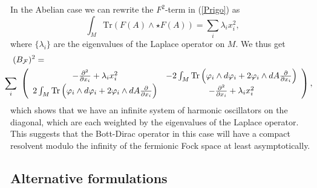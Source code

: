 \documentclass[letterpaper,11pt]{article}
\newcommand{\nn}{\nonumber}
\def\cf{{\cal F}}
\newcommand{\pa}{\partial}
\begin{document}
In the Abelian case we can rewrite the $F^2$-term in (\ref{Prigo}) as
$$
\int_M \mbox{Tr}\left( F(A)\wedge \star F(A)\right) = \sum_i \lambda_i x_i^2,
$$
where $\{\lambda_i\}$ are the eigenvalues of the Laplace operator on $M$. We thus get 
\begin{eqnarray}
(B_\cf)^2
&=&
\nn\\
&&\hspace{-2cm}
\sum_i  \ \left(
\begin{array}{cc}
 -\frac{\pa^2}{\pa x_i} +   \lambda_i x_i^2   &  -2 \int_M \mbox{Tr} \left(\varphi_i \wedge d \varphi_i  +2\varphi_i \wedge dA \frac{\pa}{\pa x_i}\right)
\\
2 \int_M \mbox{Tr} \left(\varphi_i \wedge d \varphi_i  +2\varphi_i \wedge dA \frac{\pa}{\pa x_i}\right) &  -\frac{\pa^2}{\pa x_i} +   \lambda_i x_i^2  
\end{array}
\right), \nn\\
\label{WE}
\end{eqnarray}
which shows that we have an infinite system of harmonic oscillators on the diagonal, which are each weighted by the eigenvalues of the Laplace operator. This suggests that the Bott-Dirac operator in this case will have a compact resolvent modulo the infinity of the fermionic Fock space at least asymptotically.












\subsection{Alternative formulations}
\end{document}

